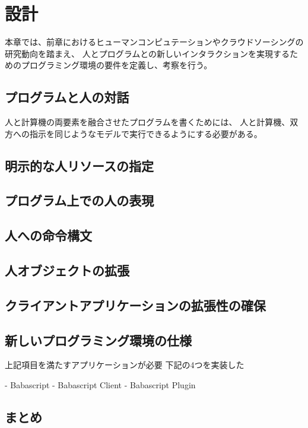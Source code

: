\chapter{設計}
\label{chap:design}

本章では、前章におけるヒューマンコンピュテーションやクラウドソーシングの研究動向を踏まえ、
人とプログラムとの新しいインタラクションを実現するためのプログラミング環境の要件を定義し、考察を行う。

\section{プログラムと人の対話}

人と計算機の両要素を融合させたプログラムを書くためには、
人と計算機、双方への指示を同じようなモデルで実行できるようにする必要がある。



\section{明示的な人リソースの指定}

\section{プログラム上での人の表現}

\section{人への命令構文}

\section{人オブジェクトの拡張}

\section{クライアントアプリケーションの拡張性の確保}

\section{新しいプログラミング環境の仕様}

上記項目を満たすアプリケーションが必要
下記の4つを実装した

- Babascript
- Babascript Client
- Babascript Plugin

\section{まとめ}
